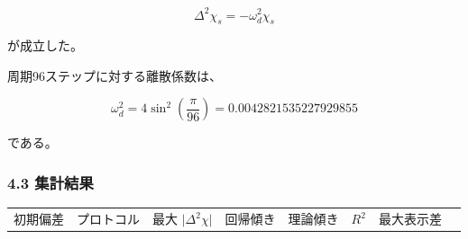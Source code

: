 \documentclass[
  10pt,
  a4paper,
]{ltjsarticle}
\newcounter{none} %
\begin{document}
\[
\Delta^2\chi_s
=-\omega_d^2\chi_s
\]

が成立した。

周期96ステップに対する離散係数は、

\[
\omega_d^2
=4\sin^2\left(\frac{\pi}{96}\right)
=0.0042821535227929855
\]

である。

\subsubsection{4.3 集計結果}\label{ux96c6ux8a08ux7d50ux679c}

\begin{landscape}
{\def\LTcaptype{none} %
\begin{longtable}[]{@{}
  >{\raggedleft\arraybackslash}p{}
  >{\raggedright\arraybackslash}p{}
  >{\raggedleft\arraybackslash}p{}
  >{\raggedleft\arraybackslash}p{}
  >{\raggedleft\arraybackslash}p{}
  >{\raggedleft\arraybackslash}p{}
  >{\raggedleft\arraybackslash}p{}
  >{\raggedleft\arraybackslash}p{}@{}}
\toprule\noalign{}
\begin{minipage}[b]{\linewidth}\raggedleft
初期偏差
\end{minipage} & \begin{minipage}[b]{\linewidth}\raggedright
プロトコル
\end{minipage} & \begin{minipage}[b]{\linewidth}\raggedleft
最大 \(\lvert\Delta^2\chi\rvert\)
\end{minipage} & \begin{minipage}[b]{\linewidth}\raggedleft
回帰傾き
\end{minipage} & \begin{minipage}[b]{\linewidth}\raggedleft
理論傾き
\end{minipage} & \begin{minipage}[b]{\linewidth}\raggedleft
\(R^2\)
\end{minipage} & \begin{minipage}[b]{\linewidth}\raggedleft
最大表示差
\end{minipage} & \begin{minipage}[b]{\linewidth}\raggedleft

\end{minipage}
\end{longtable}}
\end{landscape}
\end{document}
